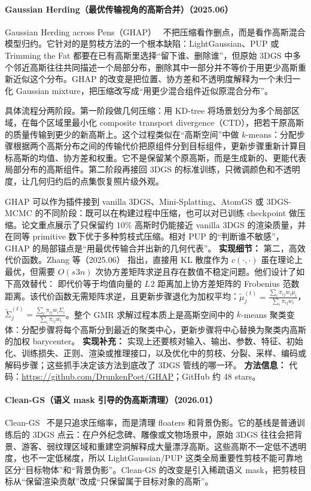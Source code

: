 \paragraph{Gaussian Herding（最优传输视角的高斯合并）（2025.06）}
Gaussian Herding across Pens（GHAP）~\cite{2506_09534} 不把压缩看作删点，而是看作高斯混合模型归约。它针对的是剪枝方法的一个根本缺陷：LightGaussian、PUP 或 Trimming the Fat 都要在已有高斯里选择“留下谁、删除谁”，但原始 3DGS 中多个邻近高斯往往共同描述一个局部分布，删除其中一部分并不等价于用更少高斯重新近似这个分布。GHAP 的改变是把位置、协方差和不透明度解释为一个未归一化 Gaussian mixture，把压缩改写成“用更少混合组件近似原混合分布”。

具体流程分两阶段。第一阶段做几何压缩：用 KD-tree 将场景划分为多个局部区域，在每个区域里最小化 composite transport divergence（CTD），把若干原高斯的质量传输到更少的新高斯上。这个过程类似在“高斯空间”中做 $k$-means：分配步骤根据两个高斯分布之间的传输代价把原组件分到目标组件，更新步骤重新计算目标高斯的均值、协方差和权重。它不是保留某个原高斯，而是生成新的、更能代表局部分布的高斯组件。第二阶段再接回 3DGS 的标准训练，只微调颜色和不透明度，让几何归约后的点集恢复照片级外观。

GHAP 可以作为插件接到 vanilla 3DGS、Mini-Splatting、AtomGS 或 3DGS-MCMC 的不同阶段：既可以在构建过程中压缩，也可以对已训练 checkpoint 做压缩。论文重点展示了只保留约 10\% 高斯时仍能接近 vanilla 3DGS 的渲染质量，并在同等 primitive 数下优于多种剪枝式压缩。相对 PUP 的“判断谁不敏感”，GHAP 的局部锚点是“用最优传输合并出新的几何代表”。
\textbf{实现细节：} 第二，高效代价函数。Zhang 等（2025.06） 指出，直接用 KL 散度作为 $c(\cdot,\cdot)$ 虽在理论上最优，但需要 $O(s^{}3 n)$ 次协方差矩阵求逆且存在数值不稳定问题。他们设计了如下高效替代： 即代价等于均值向量的 $L^{}2$ 距离加上协方差矩阵的 Frobenius 范数距离。该代价函数无需矩阵求逆，且更新步骤退化为加权平均：$\tilde{\mu}_j^{(t)} = \frac{\sum_i \pi_{ij} w_i \mu_i}{\sum_i \pi_{ij} w_i}$，$\tilde{\Sigma}_j^{(t)} = \frac{\sum_i \pi_{ij} w_i \Sigma_i}{\sum_i \pi_{ij} w_i}$。整个 GMR 求解过程本质上是高斯空间中的 $k$-means 聚类变体：分配步骤将每个高斯分到最近的聚类中心，更新步骤将中心替换为聚类内高斯的加权 barycenter。
\textbf{实现补充：} 实现上还要核对输入、输出、参数、特征、初始化、训练损失、正则、渲染或推理接口，以及优化中的剪枝、分裂、采样、编码或解码步骤；这些抓手决定该方法到底改了 3DGS 管线的哪一环。
\textbf{方法信息：} 代码：\url{https://github.com/DrunkenPoet/GHAP}；GitHub 约 48 stars。



\paragraph{Clean-GS（语义 mask 引导的伪高斯清理）（2026.01）}
Clean-GS~\cite{2601_00913} 不是只追求压缩率，而是清理 floaters 和背景伪影。它的基线是普通训练后的 3DGS 点云：在户外纪念碑、雕像或文物场景中，原始 3DGS 往往会把背景、游客、弱纹理区域和重建空洞解释成大量漂浮高斯。这些高斯不一定低不透明度，也不一定低梯度，所以 LightGaussian/PUP 这类全局重要性剪枝不能可靠地区分“目标物体”和“背景伪影”。Clean-GS 的改变是引入稀疏语义 mask，把剪枝目标从“保留渲染贡献”改成“只保留属于目标对象的高斯”。

